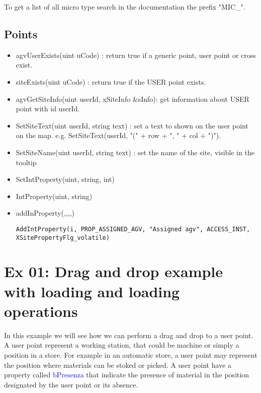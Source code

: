To get a list of all micro type search in the documentation the prefix "{MIC\_}".

\subsection{Points}

\begin{itemize}
	\item agvUserExists(uint uCode) : return true if a generic point, user point or cross exist.
	\item siteExists(uint uCode) : return true if the USER point exists.
	\item agvGetSiteInfo(uint userId, xSiteInfo \&sInfo): get information about USER point with id userId.
	\item SetSiteText(uint userId, string text) : set a text to shown on the user point on the map. e.g. SetSiteText(userId, "(" + row + ", " + col + ")").
	\item SetSiteName(uint userId, string text) : set the name of the site, visible in the tooltip\\
\end{itemize}

\begin{itemize}
	\item SetIntProperty(uint, string, int)
	\item IntProperty(uint, string)
	\item addInProperty(,,,,)
	\begin{lstlisting}[frame=none]
	AddIntProperty(i, PROP_ASSIGNED_AGV, "Assigned agv", ACCESS_INST, XSitePropertyFlg_volatile)
	\end{lstlisting}
\end{itemize}	

%
\section{Ex 01: Drag and drop example with loading and loading operations}

In this example we will see how we can perform a drag and drop to a user point. A user point represent a working station, that could be machine or simply a position in a store. For example in an automatic store, a user point may represent the position where materials can be stoked or picked. A user point have a property called \textcolor{blue}{bPresenza} that indicate the presence of material in the position designated by the user point or its absence.\\

